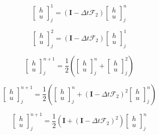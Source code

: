 \documentclass[12pt]{article}
\begin{document}
\[\left[\begin{array}{c}
h \\ u
\end{array}\right]^{1}_j = \left(\boldsymbol{I} - \Delta t\boldsymbol{\mathcal{F}}_2 \right)\left[\begin{array}{c}
h \\ u
\end{array}\right]^{n}_j  \]

\[\left[\begin{array}{c}
h \\ u
\end{array}\right]^{2}_j = \left(\boldsymbol{I} - \Delta t\boldsymbol{\mathcal{F}}_2 \right)\left[\begin{array}{c}
h \\ u
\end{array}\right]^{1}_j  \]

\[\left[\begin{array}{c}
h \\ u
\end{array}\right]^{n+1}_j = \frac{1}{2} \left(\left[\begin{array}{c}
h \\ u
\end{array}\right]^{n}_j + \left[\begin{array}{c}
h \\ u
\end{array}\right]^{2}_j\right)  \]

\[\left[\begin{array}{c}
h \\ u
\end{array}\right]^{n+1}_j = \frac{1}{2} \left(\left[\begin{array}{c}
h \\ u
\end{array}\right]^{n}_j + \left(\boldsymbol{I} - \Delta t\boldsymbol{\mathcal{F}}_2 \right)^2 \left[\begin{array}{c}
h \\ u
\end{array}\right]^{n}_j\right)  \]

\[\left[\begin{array}{c}
h \\ u
\end{array}\right]^{n+1}_j = \frac{1}{2} \left(\boldsymbol{I} + \left(\boldsymbol{I} - \Delta t\boldsymbol{\mathcal{F}}_2 \right)^2 \right) \left[\begin{array}{c}
h \\ u
\end{array}\right]^{n}_j  \]
\end{document}
